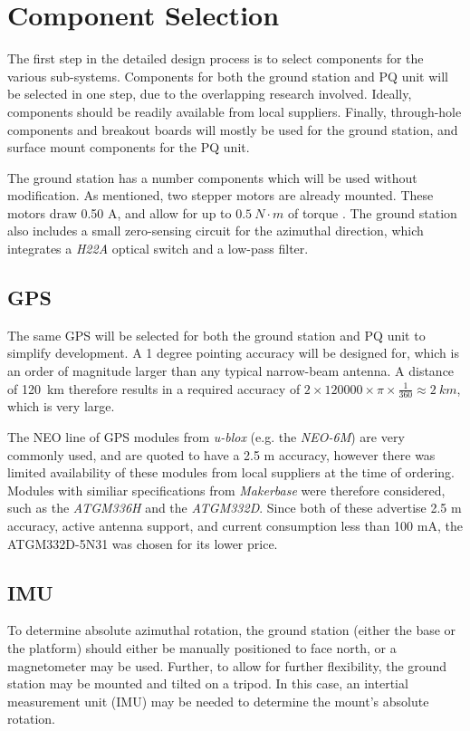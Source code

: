 \graphicspath{{./figures}}

\section{Component Selection}
The first step in the detailed design process is to select components for the various sub-systems. Components for both the ground station and PQ unit will be selected in one step, due to the overlapping research involved. Ideally, components should be readily available from local suppliers. Finally, through-hole components and breakout boards will mostly be used for the ground station, and surface mount components for the PQ unit.

The ground station has a number components which will be used without modification. As mentioned, two stepper motors are already mounted. These motors draw 0.50 A, and allow for up to $\SI{0.5}{N \cdot m}$ of torque \cite{datasheet-4118}. The ground station also includes a small zero-sensing circuit for the azimuthal direction, which integrates a \textit{H22A} optical switch \cite{datasheet-H22A1} and a low-pass filter.

\subsection{GPS}\label{sec:components_gps}
The same GPS will be selected for both the ground station and PQ unit to simplify development. A 1 degree pointing accuracy will be designed for, which is an order of magnitude larger than any typical narrow-beam antenna. A distance of \SI{120}{km} therefore results in a required accuracy of $2 \times 120 000 \times \pi \times \frac{1}{360} \approx \SI{2}{km}$, which is very large.

The NEO line of GPS modules from \textit{u-blox} (e.g. the \textit{NEO-6M}) are very commonly used, and are quoted to have a 2.5 m accuracy, however there was limited availability of these modules from local suppliers at the time of ordering. Modules with similiar specifications from \textit{Makerbase} were therefore considered, such as the \textit{ATGM336H} and the \textit{ATGM332D}. Since both of these advertise 2.5 m accuracy, active antenna support, and current consumption less than 100 mA, the ATGM332D-5N31 was chosen for its lower price.

\subsection{IMU}
To determine absolute azimuthal rotation, the ground station (either the base or the platform) should either be manually positioned to face north, or a magnetometer may be used. Further, to allow for further flexibility, the ground station may be mounted and tilted on a tripod. In this case, an intertial measurement unit (IMU) may be needed to determine the mount's absolute rotation.

